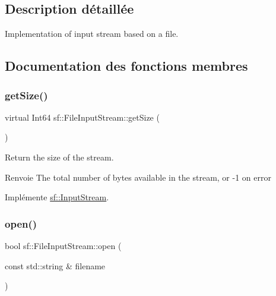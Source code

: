 \subsection{Description détaillée}
Implementation of input stream based on a file. 

\subsection{Documentation des fonctions membres}
\mbox{\label{classsf_1_1FileInputStream_aabdcaa315e088e008eeb9711ecc796e8}} 
\subsubsection{\texorpdfstring{get\+Size()}{getSize()}}
{\footnotesize\ttfamily virtual Int64 sf\+::\+File\+Input\+Stream\+::get\+Size (\begin{DoxyParamCaption}{ }\end{DoxyParamCaption})\hspace{0.3cm}{\ttfamily [virtual]}}



Return the size of the stream. 

\begin{DoxyReturn}{Renvoie}
The total number of bytes available in the stream, or -\/1 on error 
\end{DoxyReturn}


Implémente \hyperlink{classsf_1_1InputStream_a311eaaaa65d636728e5153b574b72d5d}{sf\+::\+Input\+Stream}.

\mbox{\label{classsf_1_1FileInputStream_a87a95dc3a71746097a99c86ee58bb353}} 
\subsubsection{\texorpdfstring{open()}{open()}}
{\footnotesize\ttfamily bool sf\+::\+File\+Input\+Stream\+::open (\begin{DoxyParamCaption}\item[{const std\+::string \&}]{filename }\end{DoxyParamCaption})}



